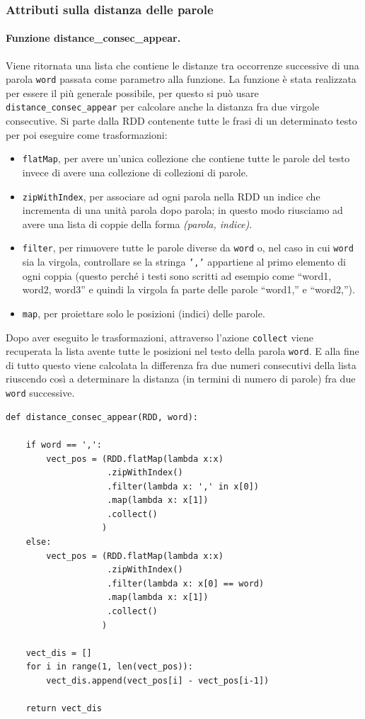\documentclass[titlepage]{article}
\begin{document}
\subsubsection{Attributi sulla distanza delle parole}
\paragraph{Funzione distance\_consec\_appear.}
Viene ritornata una lista che contiene le distanze tra occorrenze successive di una parola \texttt{word} passata come parametro alla funzione. La funzione è stata realizzata per essere il più generale possibile, per questo si può usare \texttt{distance\_consec\_appear} per calcolare anche la distanza fra due virgole consecutive. Si parte dalla RDD contenente tutte le frasi di un determinato testo per poi eseguire come trasformazioni:
\begin{itemize}
    \item \texttt{flatMap}, per avere un'unica collezione che contiene tutte le parole del testo invece di avere una collezione di collezioni di parole.
    \item \texttt{zipWithIndex}, per associare ad ogni parola nella RDD un indice che incrementa di una unità parola dopo parola; in questo modo riusciamo ad avere una lista di coppie della forma \textit{(parola, indice)}.
    \item \texttt{filter}, per rimuovere tutte le parole diverse da \texttt{word} o, nel caso in cui \texttt{word} sia la virgola, controllare se la stringa \texttt{','} appartiene al primo elemento di ogni coppia (questo perché i testi sono scritti ad esempio come ``word1, word2, word3'' e quindi la virgola fa parte delle parole ``word1,'' e ``word2,'').
    \item \texttt{map}, per proiettare solo le posizioni (indici) delle parole.
\end{itemize}
Dopo aver eseguito le trasformazioni, attraverso l'azione \texttt{collect} viene recuperata la lista avente tutte le posizioni nel testo della parola \texttt{word}. E alla fine di tutto questo viene calcolata la differenza fra due numeri consecutivi della lista riuscendo così a determinare la distanza (in termini di numero di parole) fra due \texttt{word} successive.

\begin{verbatim}
def distance_consec_appear(RDD, word):
    
    if word == ',':
        vect_pos = (RDD.flatMap(lambda x:x)
                    .zipWithIndex()
                    .filter(lambda x: ',' in x[0])
                    .map(lambda x: x[1])
                    .collect()
                   )
    else:
        vect_pos = (RDD.flatMap(lambda x:x)
                    .zipWithIndex()
                    .filter(lambda x: x[0] == word)
                    .map(lambda x: x[1])
                    .collect()
                   )
    
    vect_dis = []
    for i in range(1, len(vect_pos)):
        vect_dis.append(vect_pos[i] - vect_pos[i-1])
    
    return vect_dis
\end{verbatim}
\end{document}
